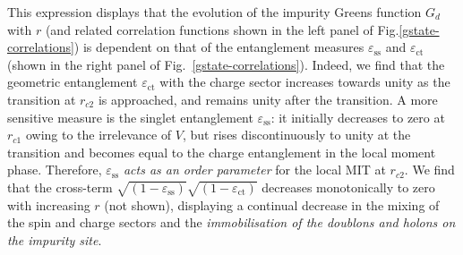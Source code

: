 \documentclass{iopart}
\begin{document}
This expression displays that the evolution of the impurity Greens function $G_{d}$ 
with $r$ (and related correlation functions shown in the left panel of Fig.\eqref{gstate-correlations}) is dependent on that of the entanglement measures $\varepsilon_{\text{ss}}$ and $\varepsilon_{\text{ct}}$ (shown in the right panel of Fig.~\eqref{gstate-correlations}). 
Indeed, we find that the geometric entanglement \(\varepsilon_\text{ct}\) with the charge sector increases towards unity as the transition at \(r_{c2}\) is approached, and remains unity after the transition. A more sensitive measure is the singlet entanglement \(\varepsilon_\text{ss}\): it initially decreases to zero at \(r_{c1}\) owing to the irrelevance of \(V\), but rises discontinuously to unity at the transition and becomes equal to the charge entanglement in the local moment phase.
Therefore, \(\varepsilon_\text{ss}\) {\it acts as an order parameter} for the local MIT at \(r_{c2}\). We find that the cross-term \(\sqrt{\left(1 - \varepsilon_\text{ss} \right)}\sqrt{\left(1 - \varepsilon_\text{ct} \right)}\) decreases monotonically to zero with increasing \(r\) (not shown), displaying a continual decrease in the mixing of the spin and charge sectors and the {\it immobilisation of the doublons and holons on the impurity site}. 
\end{document}
